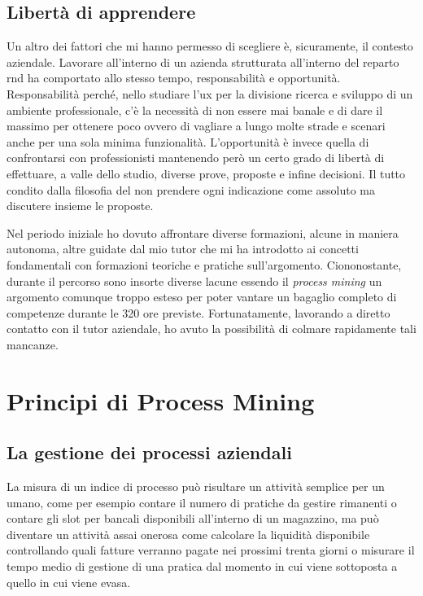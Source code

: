 \subsection{Libertà di apprendere}
Un altro dei fattori che mi hanno permesso di scegliere è, sicuramente, il contesto aziendale.
Lavorare all'interno di un azienda strutturata all'interno del reparto \acrshort{rnd} ha comportato allo stesso tempo, responsabilità e opportunità.
Responsabilità perché, nello studiare l'\acrshort{ux} per la divisione ricerca e sviluppo di un ambiente professionale, c'è la necessità di non essere mai banale e di dare il massimo per ottenere poco ovvero di vagliare a lungo molte strade e scenari anche per una sola minima funzionalità.
L'opportunità è invece quella di confrontarsi con professionisti mantenendo però un certo grado di libertà di effettuare, a valle dello studio, diverse prove, proposte e infine decisioni. Il tutto condito dalla filosofia del non prendere ogni indicazione come assoluto ma discutere insieme le proposte.

Nel periodo iniziale ho dovuto affrontare diverse formazioni, alcune in maniera autonoma, altre guidate dal mio tutor che mi ha introdotto ai concetti fondamentali con formazioni teoriche e pratiche sull'argomento.
Ciononostante, durante il percorso sono insorte diverse lacune essendo il \textit{process mining} un argomento comunque troppo esteso per poter vantare un bagaglio completo di competenze durante le 320 ore previste. Fortunatamente, lavorando a diretto contatto con il tutor aziendale, ho avuto la possibilità di colmare rapidamente tali mancanze.

\section{Principi di Process Mining}
\subsection{La gestione dei processi aziendali}

La misura di un indice di processo può risultare un attività semplice per un umano, come per esempio contare il numero di pratiche da gestire rimanenti o contare gli slot per bancali disponibili all'interno di un magazzino, ma può diventare un attività assai onerosa come calcolare la liquidità disponibile controllando quali fatture verranno pagate nei prossimi trenta giorni o misurare il tempo medio di gestione di una pratica dal momento in cui viene sottoposta a quello in cui viene evasa.


